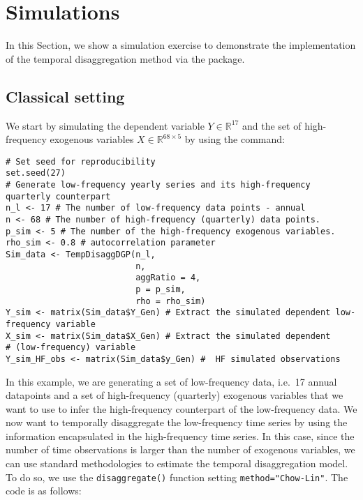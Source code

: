 \hypertarget{Simulations}{%
\section{Simulations}\label{Simulations}}

In this Section, we show a simulation exercise to demonstrate the implementation of the temporal disaggregation method via the  package.

\hypertarget{classical-setting}{%
\subsection{Classical setting}\label{classical-setting}}

We start by simulating the dependent variable \(Y\in \mathbb{R}^{17}\) and the set of high-frequency exogenous variables \(X \in \mathbb{R}^{68\times 5}\) by using the command:

\begin{verbatim}
# Set seed for reproducibility
set.seed(27)
# Generate low-frequency yearly series and its high-frequency quarterly counterpart
n_l <- 17 # The number of low-frequency data points - annual
n <- 68 # The number of high-frequency (quarterly) data points.
p_sim <- 5 # The number of the high-frequency exogenous variables.
rho_sim <- 0.8 # autocorrelation parameter
Sim_data <- TempDisaggDGP(n_l, 
                          n, 
                          aggRatio = 4,
                          p = p_sim,
                          rho = rho_sim)
Y_sim <- matrix(Sim_data$Y_Gen) # Extract the simulated dependent low-frequency variable
X_sim <- matrix(Sim_data$X_Gen) # Extract the simulated dependent 
# (low-frequency) variable
Y_sim_HF_obs <- matrix(Sim_data$y_Gen) #  HF simulated observations
\end{verbatim}

In this example, we are generating a set of low-frequency data, i.e.~17 annual datapoints and a set of high-frequency (quarterly) exogenous variables that we want to use to infer the high-frequency counterpart of the low-frequency data. We now want to temporally disaggregate the low-frequency time series by using the information encapsulated in the high-frequency time series. In this case, since the number of time observations is larger than the number of exogenous variables, we can use standard methodologies to estimate the temporal disaggregation model. To do so, we use the \texttt{disaggregate()} function setting \texttt{method="Chow-Lin"}. The code is as follows:

